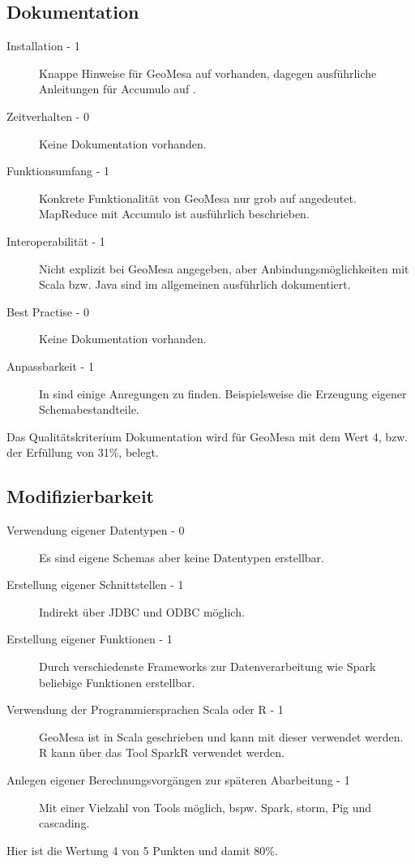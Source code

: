 \subsection{Dokumentation}
\begin{description}
\item[Installation - 1] Knappe Hinweise für GeoMesa auf \cite{website:geomesa-quickstart} vorhanden, dagegen ausführliche Anleitungen für Accumulo auf \cite{website:accumulo-manual}.
\item[Zeitverhalten - 0] Keine Dokumentation vorhanden. %
\item[Funktionsumfang - 1] Konkrete Funktionalität von GeoMesa nur grob auf \cite{website:geomesa-tutorials} angedeutet. MapReduce mit Accumulo ist ausführlich beschrieben. \cite{website:accumulo-manual}
\item[Interoperabilität - 1] Nicht explizit bei GeoMesa angegeben, aber Anbindungsmöglichkeiten mit Scala bzw. Java sind im allgemeinen ausführlich dokumentiert.
\item[Best Practise - 0] Keine Dokumentation vorhanden.
\item[Anpassbarkeit - 1] In \cite{website:geomesa-tutorials} sind einige Anregungen zu finden. Beispielsweise die Erzeugung eigener Schemabestandteile. \cite{website:geomesa-simplefeatures}
\end{description}
Das Qualitätskriterium Dokumentation wird für GeoMesa mit dem Wert 4, bzw. der Erfüllung von 31\%,  belegt.

\subsection{Modifizierbarkeit}
\begin{description}
\item[Verwendung eigener Datentypen - 0] Es sind eigene Schemas aber keine Datentypen erstellbar. \cite{website:geomesa-simplefeatures}
\item[Erstellung eigener Schnittstellen - 1] Indirekt über JDBC und ODBC möglich.
\item[Erstellung eigener Funktionen - 1] Durch verschiedenste Frameworks zur Datenverarbeitung wie Spark beliebige Funktionen erstellbar.
\item[Verwendung der Programmiersprachen Scala oder R - 1] GeoMesa ist in Scala geschrieben und kann mit dieser verwendet werden. R kann über das Tool SparkR verwendet werden.
\item[Anlegen eigener Berechnungsvorgängen zur späteren Abarbeitung - 1] Mit einer Vielzahl von Tools möglich, bspw. Spark, \Gls{storm}, Pig und \Gls{cascading}.
\end{description}
Hier ist die Wertung 4 von 5 Punkten und damit 80\%.

